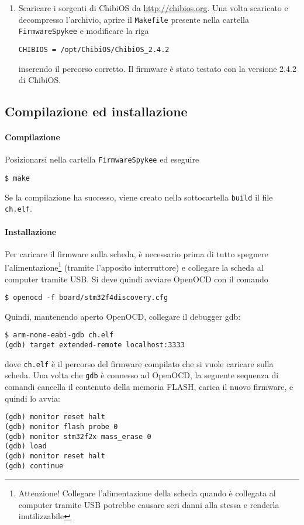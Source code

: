 \begin{enumerate}
\item Scaricare i sorgenti di ChibiOS da \url{http://chibios.org}. Una volta scaricato e decompresso l'archivio, aprire il \verb|Makefile| presente nella cartella \verb|FirmwareSpykee| e modificare la riga
\begin{verbatim}
CHIBIOS = /opt/ChibiOS/ChibiOS_2.4.2
\end{verbatim}
inserendo il percorso corretto. Il firmware è stato testato con la versione 2.4.2 di ChibiOS.
\end{enumerate}

\subsection*{Compilazione ed installazione}

\paragraph{Compilazione} Posizionarsi nella cartella \verb|FirmwareSpykee| ed eseguire
\begin{verbatim}
$ make
\end{verbatim}
Se la compilazione ha successo, viene creato nella sottocartella \verb|build| il file \verb|ch.elf|.

\paragraph{Installazione} Per caricare il firmware sulla scheda, è necessario prima di tutto spegnere l'alimentazione\footnote{Attenzione! Collegare l'alimentazione della scheda quando è collegata al computer tramite USB potrebbe causare seri danni alla stessa e renderla inutilizzabile} (tramite l'apposito interruttore) e collegare la scheda al computer tramite USB. Si deve quindi avviare OpenOCD con il comando
\begin{verbatim}
$ openocd -f board/stm32f4discovery.cfg
\end{verbatim}
Quindi, mantenendo aperto OpenOCD, collegare il debugger gdb:
\begin{verbatim}
$ arm-none-eabi-gdb ch.elf
(gdb) target extended-remote localhost:3333
\end{verbatim}
dove \verb|ch.elf| è il percorso del firmware compilato che si vuole caricare sulla scheda. Una volta che \verb|gdb| è connesso ad OpenOCD, la seguente sequenza di comandi cancella il contenuto della memoria FLASH, carica il nuovo firmware, e quindi lo avvia:
\begin{verbatim}
(gdb) monitor reset halt
(gdb) monitor flash probe 0 
(gdb) monitor stm32f2x mass_erase 0 
(gdb) load 
(gdb) monitor reset halt 
(gdb) continue
\end{verbatim}

